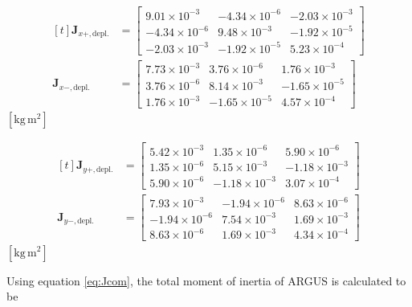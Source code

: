 \documentclass[conference,onecolumn,draftclsnofoot]{IEEEtran}
\begin{document}
\begin{minipage}[t]{0.48\textwidth}
\[
\begin{aligned}[t]
\mathbf{J}_{x+,\text{depl.}} &=
\begin{bmatrix}
9.01\times10^{-3} & -4.34\times10^{-6} & -2.03\times10^{-3} \\
-4.34\times10^{-6} & 9.48\times10^{-3} & -1.92\times10^{-5} \\
-2.03\times10^{-3} & -1.92\times10^{-5} & 5.23\times10^{-4}
\end{bmatrix}
\\[0.8em]
\mathbf{J}_{x-,\text{depl.}} &=
\begin{bmatrix}
7.73\times10^{-3} & 3.76\times10^{-6} & 1.76\times10^{-3} \\
3.76\times10^{-6} & 8.14\times10^{-3} & -1.65\times10^{-5} \\
1.76\times10^{-3} & -1.65\times10^{-5} & 4.57\times10^{-4}
\end{bmatrix}
\end{aligned}
\]
\centering
{\tiny $[\mathrm{kg\,m^2}]$}
\end{minipage}
\hfill
\begin{minipage}[t]{0.48\textwidth}
\[
\begin{aligned}[t]
\mathbf{J}_{y+,\text{depl.}} &=
\begin{bmatrix}
5.42\times10^{-3} & 1.35\times10^{-6} & 5.90\times10^{-6} \\
1.35\times10^{-6} & 5.15\times10^{-3} & -1.18\times10^{-3} \\
5.90\times10^{-6} & -1.18\times10^{-3} & 3.07\times10^{-4}
\end{bmatrix}
\\[0.8em]
\mathbf{J}_{y-,\text{depl.}} &=
\begin{bmatrix}
7.93\times10^{-3} & -1.94\times10^{-6} & 8.63\times10^{-6} \\
-1.94\times10^{-6} & 7.54\times10^{-3} & 1.69\times10^{-3} \\
8.63\times10^{-6} & 1.69\times10^{-3} & 4.34\times10^{-4}
\end{bmatrix}
\end{aligned}
\]
\centering
{\tiny $[\mathrm{kg\,m^2}]$}
\end{minipage}
\endgroup

\vspace{1em}

Using equation \eqref{eq:Jcom}, the total moment of inertia of ARGUS is calculated to be
\end{document}
